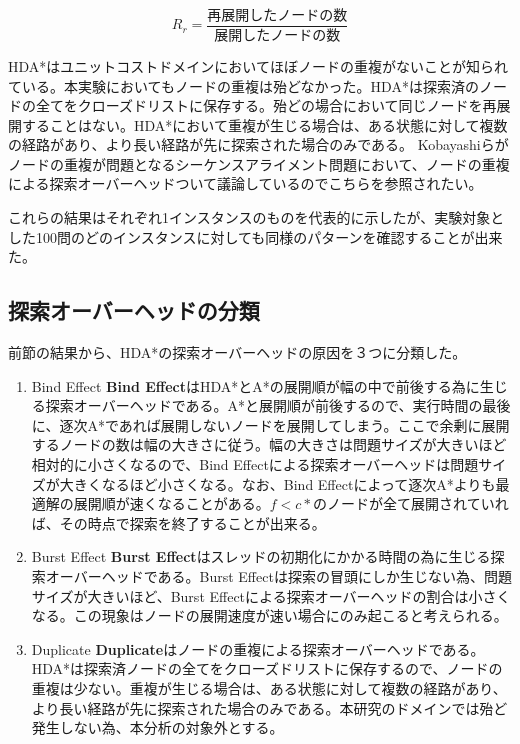 \documentclass[uplatex]{jsarticle}
\begin{document}
\begin{equation}
	R_{r} = \frac{再展開したノードの数}{展開したノードの数}
\end{equation}
\newline

HDA*はユニットコストドメインにおいてほぼノードの重複がないことが知られている\cite{Kishimoto2013}。本実験においてもノードの重複は殆どなかった。HDA*は探索済のノードの全てをクローズドリストに保存する。殆どの場合において同じノードを再展開することはない。HDA*において重複が生じる場合は、ある状態に対して複数の経路があり、より長い経路が先に探索された場合のみである。%
Kobayashiらがノードの重複が問題となるシーケンスアライメント問題において、ノードの重複による探索オーバーヘッドついて議論しているのでこちらを参照されたい\cite{kobayashi2011evaluations}。

これらの結果はそれぞれ1インスタンスのものを代表的に示したが、実験対象とした100問のどのインスタンスに対しても同様のパターンを確認することが出来た。


\subsection{探索オーバーヘッドの分類}

前節の結果から、HDA*の探索オーバーヘッドの原因を３つに分類した。

\begin{enumerate}
\item Bind Effect
\newline
\textbf{Bind Effect}はHDA*とA*の展開順が幅の中で前後する為に生じる探索オーバーヘッドである。A*と展開順が前後するので、実行時間の最後に、逐次A*であれば展開しないノードを展開してしまう。ここで余剰に展開するノードの数は幅の大きさに従う。幅の大きさは問題サイズが大きいほど相対的に小さくなるので、Bind Effectによる探索オーバーヘッドは問題サイズが大きくなるほど小さくなる。なお、Bind Effectによって逐次A*よりも最適解の展開順が速くなることがある。$f < c*$のノードが全て展開されていれば、その時点で探索を終了することが出来る。
\newline

\item Burst Effect
\newline
\textbf{Burst Effect}はスレッドの初期化にかかる時間の為に生じる探索オーバーヘッドである。Burst Effectは探索の冒頭にしか生じない為、問題サイズが大きいほど、Burst Effectによる探索オーバーヘッドの割合は小さくなる。この現象はノードの展開速度が速い場合にのみ起こると考えられる。
\newline

\item Duplicate
\newline
\textbf{Duplicate}はノードの重複による探索オーバーヘッドである。HDA*は探索済ノードの全てをクローズドリストに保存するので、ノードの重複は少ない。重複が生じる場合は、ある状態に対して複数の経路があり、より長い経路が先に探索された場合のみである。本研究のドメインでは殆ど発生しない為、本分析の対象外とする。

\end{enumerate}
\end{document}
